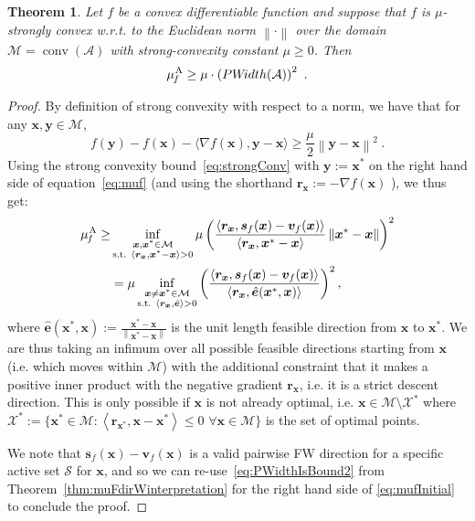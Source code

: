 \documentclass{article} %
\newtheorem{theorem}[definition]{Theorem}
\DeclareMathOperator*{\conv}{conv}
\providecommand{\norm}[1]{\left\lVert#1\right\rVert}
\newcommand{\X}{\mathcal{X}}
\newcommand{\domain}{\mathcal{M}} %
\newcommand{\away}{{\hspace{0.06em}\textnormal{\scriptsize A}}}
\newcommand{\strongConvAFW}{\mu_{\hspace{-0.08em}f}^\away}
\newcommand{\x}{\bm{x}}
\newcommand{\y}{\bm{y}}
\newcommand{\s}{\bm{s}}
\newcommand{\vv}{\bm{v}} %
\newcommand{\Vertices}{\mathcal{A}} %
\renewcommand{\S}{\mathcal{S}}
\renewcommand{\r}{\bm{r}}
\newcommand{\PWidth}{\mathop{PW\!idth}}
\newcommand{\innerProd}[2]{\left\langle #1 , #2 \right\rangle}
\newcommand{\err}{\bm{e}} %
\newcommand{\0}{\mathbf{0}} %
\begin{document}
\begin{theorem}\label{thm:muFdirWinterpretation2}
Let $f$ be a convex differentiable function and suppose that $f$ is
$\mu$-\emph{strongly convex} w.r.t. to the Euclidean norm
$\norm{\cdot}$ over the domain $\domain=\conv(\Vertices)$ with strong-convexity constant $\mu
\geq 0$. Then
\begin{equation} \label{eq:muDirWidthBound}
\strongConvAFW \geq \mu \cdot \left( \PWidth(\Vertices) \right)^2 \ .
\end{equation}
\end{theorem}
%
\begin{proof}
By definition of strong convexity with respect to a norm, we have that for any $\x,\y\in\domain$,
\begin{equation} \label{eq:strongConv}
f(\y)- f(\x)- \langle\nabla f(\x), \y-\x \rangle
\geq \textstyle\frac{\mu}{2} \norm{\y-\x}^2 \ .
\end{equation}
Using the strong convexity bound~\eqref{eq:strongConv} with $\y := \x^*$ on the right hand side of equation~\eqref{eq:muf} (and using the shorthand $\r_{\x} := -\nabla f(\x)$ ), we thus get:
\begin{align}
\strongConvAFW \geq&  \inf_{\substack{\x, \x^* \in \domain\\
                                   \textrm{s.t. } \innerProd{\r_{\x}}{\x^*-\x} > 0}}
                      \mu \left(  \frac{\innerProd{\r_{\x}}{ \s_f(\x) - \vv_f(\x)}}{\innerProd{\r_{\x}}{\x^*-\x}} \norm{{\x^*-\x}} \right)^2 \nonumber \\
		&=  \mu \inf_{\substack{\x \neq \x^* \in \domain \\
                        \textrm{s.t. } \innerProd{\r_{\x}}{ \hat{\err}} > 0}}
           \left(  \frac{\innerProd{\r_{\x}}{ \s_f(\x) - \vv_f(\x)}}{\innerProd{\r_{\x}}{ \hat{\err}(\x^*,\x)}} \right)^2  , \label{eq:mufInitial}
\end{align}
where $\hat{\err}(\x^*,\x) := \frac{\x^*-\x}{\norm{\x^*-\x}}$ is the unit length feasible
direction from $\x$ to $\x^*$. We are thus taking an infimum over all
possible feasible directions starting from $\x$ (i.e. which moves within
$\domain$) with the additional constraint that it makes a positive inner
product with the negative gradient $\r_{\x}$, i.e. it is a strict descent
direction. This is only possible if $\x$ is not already optimal, i.e. $\x \in
\domain \setminus \X^*$ where $\X^* := \{\x^* \in \domain :
\innerProd{\r_{\x^*}}{\x-\x^*} \leq 0 \,\, \forall \x \in \domain \}$ is the
set of optimal points. 

We note that $\s_f(\x) - \vv_f(\x)$ is a valid pairwise FW direction for a specific active set $\S$ for $\x$, and so we can re-use~\eqref{eq:PWidthIsBound2} from Theorem~\ref{thm:muFdirWinterpretation} for the right hand side of \eqref{eq:mufInitial} to conclude the proof.
\end{proof}
\end{document}
